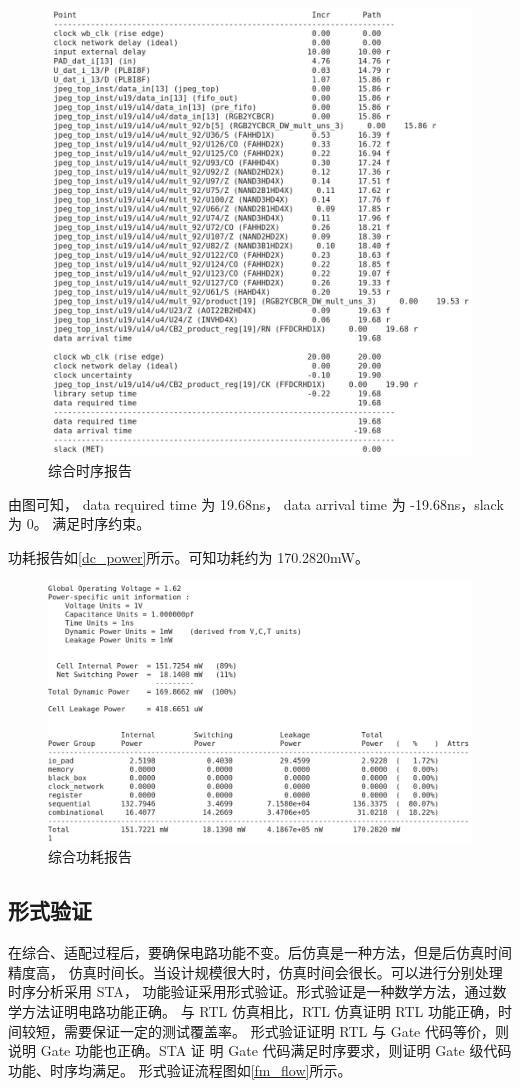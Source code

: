 \documentclass[12pt,hyperref,a4paper,UTF8]{ctexart}
\begin{document}
\begin{figure}[htbp]
    \centering
    \includegraphics[width =.6\textwidth]{figures/dc_timing.png}
    \caption{综合时序报告}
    \label{dc_timing}
\end{figure}
由图可知， data required time 为 19.68\unit{\ns}， data arrival time 为 -19.68\unit{\ns}，slack 为 0。
满足时序约束。

功耗报告如\autoref{dc_power}所示。可知功耗约为 170.2820\unit{\mW}。
\begin{figure}[htbp]
    \centering
    \includegraphics[width =.6\textwidth]{figures/dc_power.png}
    \caption{综合功耗报告}
    \label{dc_power}
\end{figure}

\subsection{形式验证}
在综合、适配过程后，要确保电路功能不变。后仿真是一种方法，但是后仿真时间精度高，
仿真时间长。当设计规模很大时，仿真时间会很长。可以进行分别处理时序分析采用 STA，
功能验证采用形式验证。形式验证是一种数学方法，通过数学方法证明电路功能正确。
与 RTL 仿真相比，RTL 仿真证明 RTL 功能正确，时间较短，需要保证一定的测试覆盖率。
形式验证证明 RTL 与 Gate 代码等价，则说明 Gate 功能也正确。STA 证
明 Gate 代码满足时序要求，则证明 Gate 级代码功能、时序均满足。
形式验证流程图如\autoref{fm_flow}所示。
\end{document}
